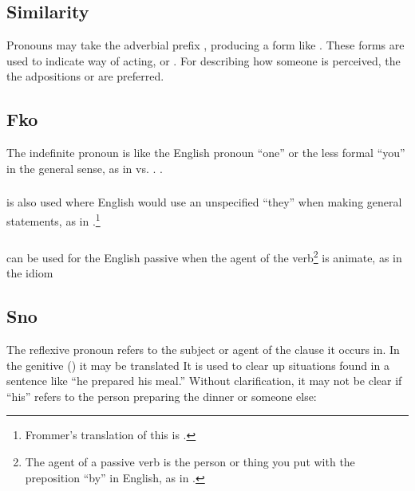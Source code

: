\subsection{Similarity} Pronouns may take the adverbial prefix
, producing a form like  . These forms
are used to indicate way of acting,   or . For describing how someone is
perceived, the the adpositions  or  are preferred. 

\subsection{Fko} The indefinite pronoun  is like the English
pronoun ``one'' or the less formal ``you'' in the general sense, as in
 vs. .  
 .

\subsubsection{}  is also used where English would use an
unspecified ``they'' when making general statements, as in
.\footnote{Frommer's
translation of this is .}

\subsubsection{}  can be used for the English passive when the
agent of the verb\footnote{The agent of a passive verb is the person
or thing you put with the preposition ``by'' in English, as in .} is animate, as in the idiom    
\label{syn:prn:fko}

\subsection{Sno} 
The reflexive pronoun  refers to the subject or agent of the
clause it occurs in.  In the genitive () it may be
translated   It is used to clear
up situations found in a sentence like ``he prepared his meal.''
Without clarification, it may not be clear if ``his'' refers to the
person preparing the dinner or someone else:

